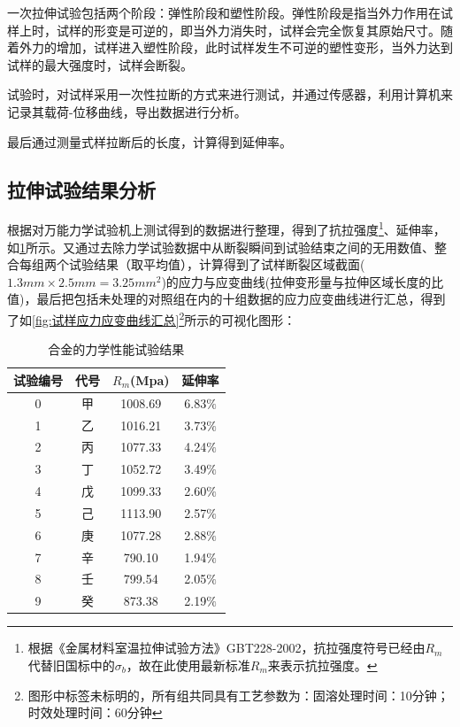 一次拉伸试验包括两个阶段：弹性阶段和塑性阶段。弹性阶段是指当外力作用在试样上时，试样的形变是可逆的，即当外力消失时，试样会完全恢复其原始尺寸。随着外力的增加，试样进入塑性阶段，此时试样发生不可逆的塑性变形，当外力达到试样的最大强度时，试样会断裂。

试验时，对试样采用一次性拉断的方式来进行测试，并通过传感器，利用计算机来记录其载荷-位移曲线，导出数据进行分析。

最后通过测量式样拉断后的长度，计算得到延伸率。

\subsection{拉伸试验结果分析}
根据对万能力学试验机上测试得到的数据进行整理，得到了抗拉强度\footnote{根据《金属材料室温拉伸试验方法》GBT228-2002，抗拉强度符号已经由$ R_m $代替旧国标中的$ \sigma_b $，故在此使用最新标准$ R_m $来表示抗拉强度。}、延伸率，如\ref{sec:mystrength}所示。又通过去除力学试验数据中从断裂瞬间到试验结束之间的无用数值、整合每组两个试验结果（取平均值），计算得到了试样断裂区域截面($ 1.3mm\times2.5mm=3.25mm^2 $)的应力与应变曲线(拉伸变形量与拉伸区域长度的比值)，最后把包括未处理的对照组在内的十组数据的应力应变曲线进行汇总，得到了如\ref{fig:试样应力应变曲线汇总}\footnote{图形中标签未标明的，所有组共同具有工艺参数为：固溶处理时间：10分钟；时效处理时间：60分钟}所示的可视化图形：
\begin{table}[htbp]
	\centering
	\caption{\ti 合金的力学性能试验结果}
	\label{sec:mystrength}
	\begin{tabular}{cccc}
		\toprule
		试验编号& 代号&$ R_m $(Mpa)&延伸率 \\
		\midrule
		0 & 甲 & 1008.69 & 6.83$\%$ \\
		1 & 乙 & 1016.21 & 3.73$\%$ \\
		2 & 丙 & 1077.33 & 4.24$\%$ \\
		3 & 丁 & 1052.72 & 3.49$\%$ \\
		4 & 戊 & 1099.33 & 2.60$\%$ \\
		5 & 己 & 1113.90 & 2.57$\%$ \\
		6 & 庚 & 1077.28 & 2.88$\%$ \\
		7 & 辛 & 790.10 & 1.94$\%$ \\
		8 & 壬 & 799.54 & 2.05$\%$ \\
		9 & 癸 & 873.38 & 2.19$\%$ \\
		\bottomrule
	\end{tabular}
\end{table}
